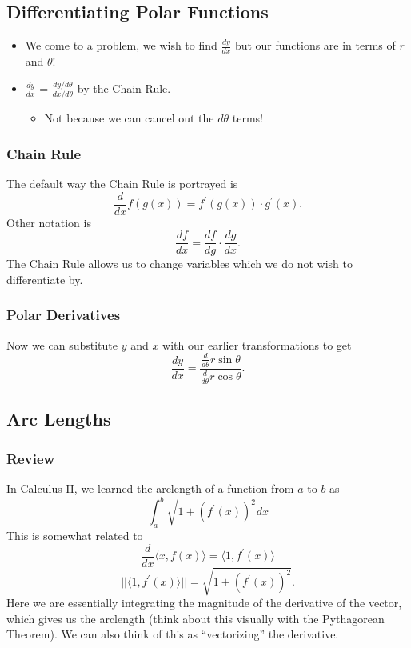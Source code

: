 \documentclass[12pt]{article}
\theoremstyle{plain} %
\theoremstyle{definition}
\theoremstyle{definition}
\theoremstyle{remark}
\begin{document}
\subsection{Differentiating Polar Functions}
\begin{itemize}
    \item We come to a problem, we wish to find $\frac{dy}{dx}$ but our functions are in terms of $r$ and $\theta$!
    \item $\frac{dy}{dx}$ = $\frac{dy/d\theta}{dx/d\theta}$ by the Chain Rule.
    \begin{itemize}
        \item Not because we can cancel out the $d\theta$ terms!
    \end{itemize}
\end{itemize}

\subsubsection{Chain Rule}
The default way the Chain Rule is portrayed is
\[ \frac{d}{dx} f(g(x)) = f^\prime(g(x)) \cdot g^\prime(x) \text{.} \]
Other notation is
\[ \frac{df}{dx} = \frac{df}{dg} \cdot \frac{dg}{dx} \text{.} \]
The Chain Rule allows us to change variables which we do not wish to differentiate by.
\subsubsection{Polar Derivatives}
Now we can substitute $y$ and $x$ with our earlier transformations to get
\[ \frac{dy}{dx} = \frac{\frac{d}{d\theta}r\sin{\theta}}{\frac{d}{d\theta}r\cos{\theta}} \text{.} \]

\subsection{Arc Lengths}
\subsubsection{Review}
In Calculus II, we learned the arclength of a function from $a$ to $b$ as
\[ \int_a^b{\sqrt{1+(f^\prime(x))^2}dx} \]
This is somewhat related to
\[ \frac{d}{dx} \langle x,f(x) \rangle = \langle 1,f^\prime(x) \rangle \]
\[ || \langle1, f^\prime(x) \rangle || = \sqrt{1+(f^\prime(x))^2} \text{.} \]
Here we are essentially integrating the magnitude of the derivative of the vector, which gives us the arclength (think about this visually with the Pythagorean Theorem).
We can also think of this as ``vectorizing'' the derivative.
\end{document}
